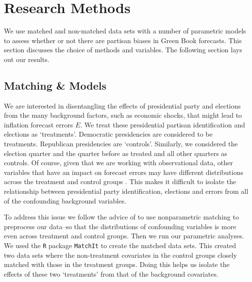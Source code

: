 \documentclass[a4paper]{article}\usepackage{graphicx, color}
\begin{document}
\section{Research Methods}

We use matched and non-matched data sets with a number of parametric models \citep[see][]{Ho2007} to assess whether or not there are partisan biases in Green Book forecasts. This section discusses the choice of methods and variables. The following section lays out our results.

\subsection{Matching \& Models}

We are interested in disentangling the effects of presidential party and elections from the many background factors, such as economic shocks, that might lead to inflation forecast errors $E$. We treat these presidential partisan identification and elections as `treatments'. Democratic presidencies are considered to be treatments. Republican presidencies are `controls'. Similarly, we considered the election quarter and the quarter before as treated and all other quarters as controls. Of course, given that we are working with observational data, other variables that have an impact on forecast errors may have different distributions across the treatment and control groups \citep{Diamond2012, Cochran1973}. This makes it difficult to isolate the relationship between presidential party identification, elections and errors from all of the confounding background variables.

To address this issue we follow the advice of \cite{Ho2007} to use nonparametric matching to preprocess our data--so that the distributions of confounding variables is more even across treatment and control groups. Then we run our parametric analyses. We used the {\tt{R}} package {\tt{MatchIt}} \citep{matchit2011} to create the matched data sets. This created two data sets where the non-treatment covariates in the control groups closely matched with those in the treatment groups. Doing this helps us isolate the effects of these two `treatments' from that of the background covariates. 
\end{document}
